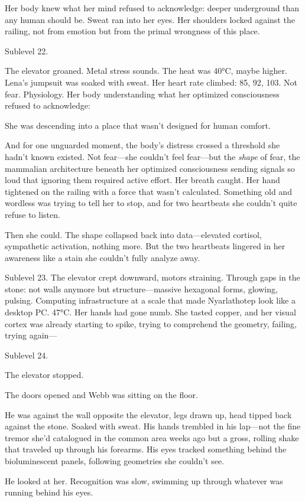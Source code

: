 Her body knew what her mind refused to acknowledge: deeper underground than any human should be. Sweat ran into her eyes. Her shoulders locked against the railing, not from emotion but from the primal wrongness of this place.

Sublevel 22.

The elevator groaned. Metal stress sounds. The heat was 40°C, maybe higher. Lena's jumpsuit was soaked with sweat. Her heart rate climbed: 85, 92, 103. Not fear. Physiology. Her body understanding what her optimized consciousness refused to acknowledge:

She was descending into a place that wasn't designed for human comfort.

And for one unguarded moment, the body's distress crossed a threshold she hadn't known existed. Not fear—she couldn't feel fear—but the \textit{shape} of fear, the mammalian architecture beneath her optimized consciousness sending signals so loud that ignoring them required active effort. Her breath caught. Her hand tightened on the railing with a force that wasn't calculated. Something old and wordless was trying to tell her to stop, and for two heartbeats she couldn't quite refuse to listen.

Then she could. The shape collapsed back into data—elevated cortisol, sympathetic activation, nothing more. But the two heartbeats lingered in her awareness like a stain she couldn't fully analyze away.

Sublevel 23. The elevator crept downward, motors straining. Through gaps in the stone: not walls anymore but structure—massive hexagonal forms, glowing, pulsing. Computing infrastructure at a scale that made Nyarlathotep look like a desktop PC. 47°C. Her hands had gone numb. She tasted copper, and her visual cortex was already starting to spike, trying to comprehend the geometry, failing, trying again—

Sublevel 24.

The elevator stopped.

The doors opened and Webb was sitting on the floor.

He was against the wall opposite the elevator, legs drawn up, head tipped back against the stone. Soaked with sweat. His hands trembled in his lap—not the fine tremor she'd catalogued in the common area weeks ago but a gross, rolling shake that traveled up through his forearms. His eyes tracked something behind the bioluminescent panels, following geometries she couldn't see.

He looked at her. Recognition was slow, swimming up through whatever was running behind his eyes.

